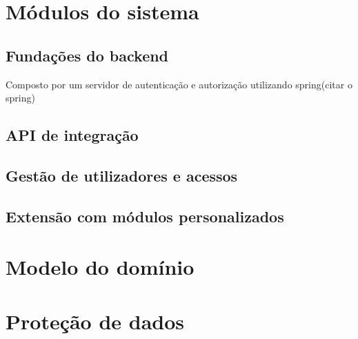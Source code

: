 \section{Módulos do sistema}
\subsection{Fundações do backend}
Composto por um servidor de autenticação e autorização utilizando spring(citar o spring) 
\subsection{API de integração}
\subsection{Gestão de utilizadores e acessos}
\subsection{Extensão com módulos personalizados}


\section{Modelo do domínio}


\section{Proteção de dados}



\cleardoublepage